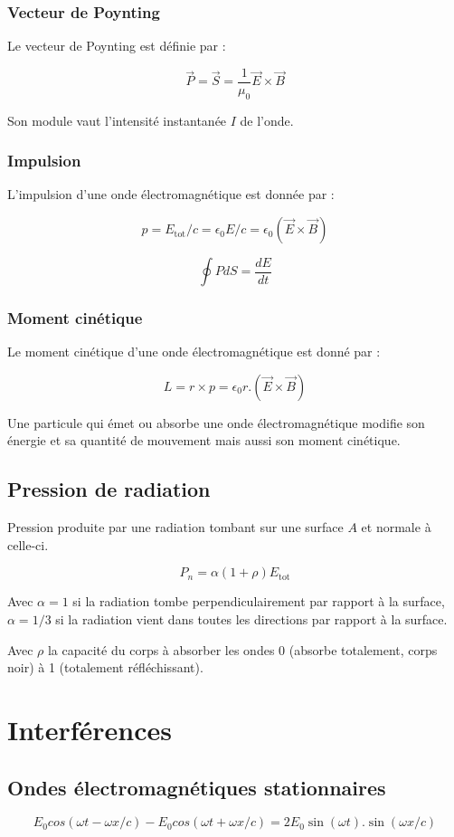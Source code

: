 \documentclass[a4paper,10pt,openright,titlepage]{report}
\begin{document}
\subsubsection{Vecteur de Poynting}
Le vecteur de Poynting est définie par :

$$\vec P = \vec S = \frac{1}{\mu_0} \vec E \times \vec B$$

Son module vaut l'intensité instantanée $I$ de l'onde.
\subsubsection{Impulsion}
L'impulsion d'une onde électromagnétique est donnée par :

$$p = E_{\mbox{tot}}/c = \epsilon_0 E/c = \epsilon_0 (\vec E \times \vec B)$$

$$\oint P dS = \frac{dE}{dt}$$
\subsubsection{Moment cinétique}
Le moment cinétique d'une onde électromagnétique est donné par :

$$L = r \times p = \epsilon_0 r. (\vec E \times \vec B)$$

Une particule qui émet ou absorbe une onde électromagnétique modifie son énergie et sa quantité de mouvement mais aussi son moment cinétique.

\subsection{Pression de radiation}

Pression produite par une radiation tombant sur une surface $A$ et normale à celle-ci.

$$P_n = \alpha (1+\rho) E_{\mbox{tot}}$$

Avec $\alpha = 1$ si la radiation tombe perpendiculairement par rapport à la surface, $\alpha = 1/3$ si la radiation vient dans toutes les directions par rapport à la surface.

Avec $\rho$ la capacité du corps à absorber les ondes 0 (absorbe totalement, corps noir) à 1 (totalement réfléchissant).

\section{Interférences}

\subsection{Ondes électromagnétiques stationnaires}
$$E_0 cos (\omega t - \omega x /c) - E_0 cos ( \omega t + \omega x/c ) = 2 E_0 \sin (\omega t).\sin(\omega x/c)$$
\end{document}
